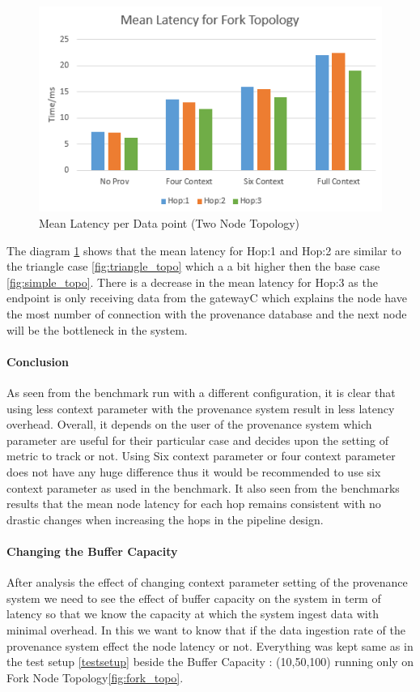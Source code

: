 \begin{figure}[H]
	\center
	\includegraphics[width=\textwidth]{figures/ForkTopology_latency.PNG}
	\caption{Mean Latency per Data point  (Two Node Topology)}
	\label{fig:forktopo_latency}
\end{figure}

The diagram \ref{fig:forktopo_latency} shows that the mean latency for Hop:1 and Hop:2 are similar to the triangle case \ref{fig:triangle_topo} which a a bit higher then the base case \ref{fig:simple_topo}. There is a decrease in the mean latency for Hop:3 as the endpoint is only receiving data from the gatewayC which explains the node have the most number of connection with the provenance database and the next node will be the bottleneck in the system. 

\paragraph*{Conclusion}
As seen from the benchmark run with a different configuration, it is clear that using less context parameter with the provenance system result in less latency overhead. Overall, it depends on the user of the provenance system which parameter are useful for their particular case and decides upon the setting of metric to track or not. Using Six context parameter or four context parameter does not have any huge difference thus it would be recommended to use six context parameter as used in the benchmark. It also seen from the benchmarks results that the mean node latency for each hop remains consistent with no drastic changes when increasing the hops in the pipeline design.


\paragraph*{Changing the Buffer Capacity}
After analysis the effect of changing context parameter setting of the provenance system we need to see the effect of buffer capacity on the system in term of latency so that we know the capacity at which the system ingest data with minimal overhead. In this we want to know that if the data ingestion rate of the provenance system effect the node latency or not.
Everything was kept same as in the test setup \ref{testsetup} beside the Buffer Capacity : (10,50,100) running only on Fork Node Topology\ref{fig:fork_topo}.

